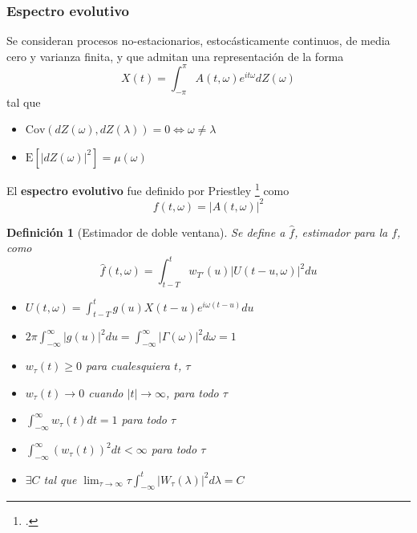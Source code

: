 \documentclass{beamer}
\newtheorem{defn}{Definici\'on}
\newcommand{\intPI}{\int_{-\pi}^{\pi}}
\newcommand{\est}[1]{\widehat{ #1 }}
\newcommand{\E}[1]{\mathrm{E}\left[ #1 \right]}
\newcommand{\Cov}[1]{\mathrm{Cov}\left( #1 \right)}
\newcommand{\abso}[1]{\left| #1 \right|}
\begin{document}
\begin{frame}\frametitle{Espectro evolutivo}
Se consideran procesos no-estacionarios, estoc\'asticamente continuos, de media cero y varianza 
finita, y que admitan una representaci\'on de la forma
\begin{equation*}
X(t) = \intPI A(t,\omega) e^{i t \omega} dZ(\omega)
\end{equation*}
tal que 
\begin{itemize}
\item $\Cov{dZ(\omega),dZ(\lambda)} = 0 \Leftrightarrow \omega \neq \lambda$
\item $\E{\abso{dZ(\omega)}^{2}} = \mu(\omega)$
\end{itemize}

El \textbf{espectro evolutivo} fue definido por Priestley \footcite{Priestley65} como
\begin{equation*}
f(t,\omega) = \abso{A(t,\omega)}^{2}
\end{equation*}
\end{frame}


\begin{frame}%
\begin{defn}[Estimador de doble ventana]
Se define a $\est{f}$, estimador para la $f$, como
\begin{equation*}
\widehat{f}(t,\omega) = \int_{t-T}^{t} w_{T'}(u) \lvert U(t-u,\omega) \lvert^{2} du
\end{equation*}

\begin{itemize}
\item $U(t,\omega) = \int_{t-T}^{t} g(u) X({t-u}) e^{i \omega (t-u)} du$

\item $2\pi \int_{-\infty}^{\infty} \lvert g(u) \lvert^{2} du = 
\int_{-\infty}^{\infty} \lvert \Gamma(\omega) \lvert^{2} d\omega = 1$
\item $w_{\tau}(t) \geq 0$ para cualesquiera $t$, $\tau$
\item $w_{\tau}(t) \rightarrow 0$ cuando $\lvert t \lvert \rightarrow \infty$, para todo $\tau$
\item $\int_{-\infty}^{\infty} w_{\tau}(t) dt = 1$ para todo $\tau$
\item $ \int_{-\infty}^{\infty} \left( w_{\tau}(t) \right)^{2} dt < \infty$ para todo $\tau$
\item $\exists C$ tal que  
$ \lim_{\tau\rightarrow\infty} \tau \int_{-\infty}^{t} \abso{ W_{\tau}(\lambda) }^{2} d\lambda = C$
\end{itemize}
\end{defn}
\end{frame}
\end{document}
